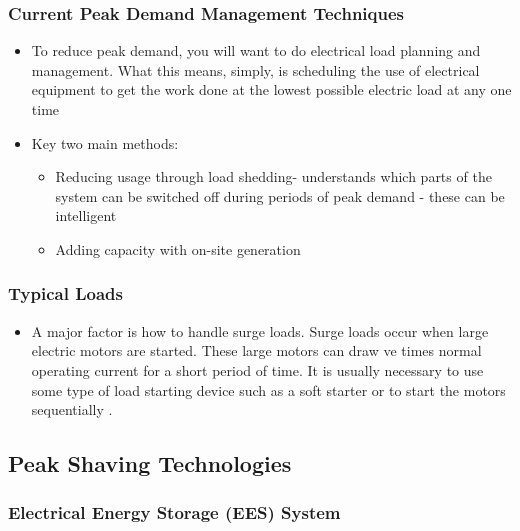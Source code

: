 \subsubsection{Current Peak Demand Management
Techniques}\label{current-peak-demand-management-techniques}

\begin{itemize}
\tightlist
\item
  To reduce peak demand, you will want to do electrical load planning
  and management. What this means, simply, is scheduling the use of
  electrical equipment to get the work done at the lowest possible
  electric load at any one time \cite{Reducing37:online}
\item
  Key two main methods:

  \begin{itemize}
  \tightlist
  \item
    Reducing usage through load shedding- understands which parts of the
    system can be switched off during periods of peak demand - these can
    be intelligent \cite{6199851}
  \item
    Adding capacity with on-site generation \cite{schneiderRECPS}
  \end{itemize}
\end{itemize}

\subsubsection{Typical Loads}\label{typical-loads}

\begin{itemize}
\tightlist
\item
  A major factor is how to handle surge loads. Surge loads occur when
  large electric motors are started. These large motors can draw ve
  times normal operating current for a short period of time. It is
  usually necessary to use some type of load starting device such as a
  soft starter or to start the motors sequentially \cite{baldorPS}.
\end{itemize}

\subsection{Peak Shaving Technologies}\label{peak-shaving-technologies}

\subsubsection{Electrical Energy Storage (EES)
System}\label{electrical-energy-storage-ees-system}

